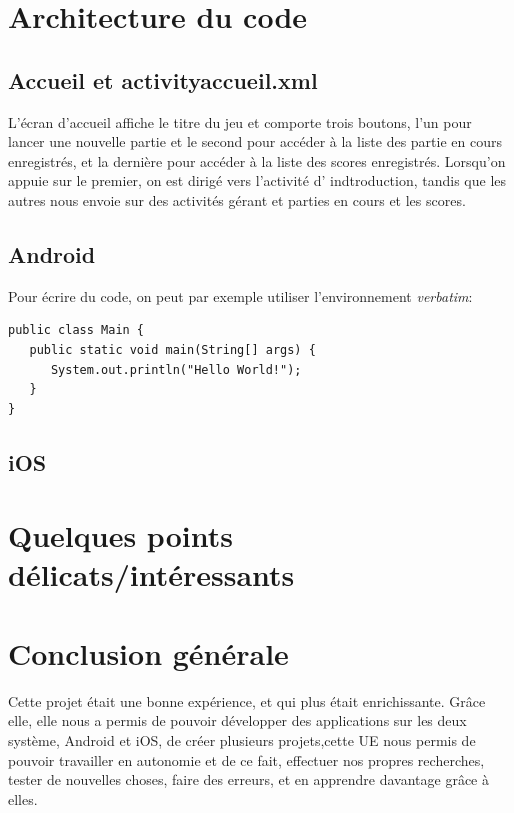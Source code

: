 \documentclass{article}
\begin{document}
\section{Architecture du code}
\subsection{Accueil et activityaccueil.xml}
L’écran d’accueil affiche le titre du jeu et comporte trois boutons, l’un pour lancer une nouvelle
partie et le second pour accéder à la liste des partie en cours  enregistrés, et la dernière pour accéder à la liste des scores enregistrés. Lorsqu’on appuie sur le premier, on est dirigé vers l’activité d' indtroduction, tandis que les autres nous envoie sur des activités
gérant et parties en cours et les scores.

\subsection{Android} %
Pour écrire du code, on peut par exemple utiliser l'environnement
\textit{verbatim}:
\begin{verbatim}
public class Main {
   public static void main(String[] args) {
      System.out.println("Hello World!");
   }
}
\end{verbatim}

\subsection{iOS} %


\section{Quelques points délicats/intéressants}


\section{Conclusion générale}
	Cette projet était une bonne expérience, et qui plus était enrichissante.
Grâce elle, elle nous a permis de pouvoir développer des applications sur les deux système,
Android et iOS, de créer plusieurs projets,cette UE nous permis de pouvoir travailler en autonomie
et de ce fait, effectuer nos propres recherches, tester de nouvelles choses, faire des erreurs, et en
apprendre davantage grâce à elles.




\end{document}
